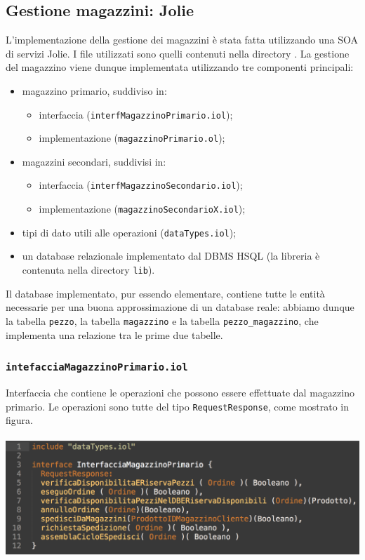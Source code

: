 \subsection{Gestione magazzini: Jolie}
L'implementazione della gestione dei magazzini \`e stata fatta
utilizzando una SOA di servizi Jolie. I file utilizzati sono quelli
contenuti nella directory .
La gestione del magazzino viene dunque implementata utilizzando tre
componenti principali: 
\begin{itemize}
  \item magazzino primario, suddiviso in:
    \begin{itemize}
      \item interfaccia ({\tt interfMagazzinoPrimario.iol});
      \item implementazione ({\tt magazzinoPrimario.ol});
    \end{itemize}
  \item magazzini secondari, suddivisi in:
    \begin{itemize}
      \item interfaccia ({\tt interfMagazzinoSecondario.iol});
      \item implementazione ({\tt magazzinoSecondarioX.iol});
    \end{itemize}
  \item tipi di dato utili alle operazioni ({\tt dataTypes.iol});
  \item un database relazionale implementato dal DBMS HSQL (la libreria
  \`e contenuta nella directory {\tt lib}).
\end{itemize}
Il database implementato, pur essendo elementare, contiene tutte le
entit\`a necessarie per una buona approssimazione di un database reale:
abbiamo dunque la tabella {\tt pezzo}, la tabella {\tt magazzino} e la
tabella {\tt pezzo\_magazzino}, che implementa una relazione tra le
prime due tabelle.

\subsubsection*{\tt intefacciaMagazzinoPrimario.iol}
Interfaccia che contiene le operazioni che possono essere effettuate dal
magazzino primario. Le operazioni sono tutte del tipo
{\tt RequestResponse}, come mostrato in figura. \\\\
\includegraphics[scale=0.4]{immagini/interfMagazzinoPrimario.png}

